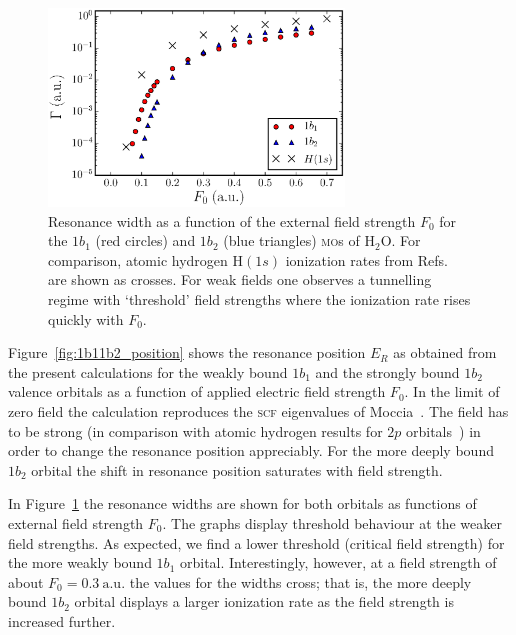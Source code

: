 \begin{figure}
  \centering
  \includegraphics[width=0.7\textwidth]{figures/ch_H2O/1b1_1b2/resWidthvsF1b11b2H1s.eps}
  \caption{Resonance width as a function of the external field
    strength $F_{0}$ for the $1b_{1}$ (red circles) and $1b_{2}$ (blue
    triangles) \textsc{mo}s of H$_{2}$O. For comparison, atomic
    hydrogen H$(1s)$ ionization rates from
    Refs.~\cite{Telnov_1989,Kolosov_1987} are shown as crosses. For
    weak fields one observes a tunnelling regime with `threshold'
    field strengths where the ionization rate rises quickly with
    $F_{0}$.}
  \label{fig:1b11b2_width}
\end{figure}

Figure~\ref{fig:1b11b2_position} shows the resonance position $E_{R}$
as obtained from the present calculations for the weakly bound
$1b_{1}$ and the strongly bound $1b_{2}$ valence orbitals as a
function of applied electric field strength $F_{0}$. In the limit of
zero field the calculation reproduces the \textsc{scf} eigenvalues of
Moccia~\cite{Moccia_1964}. The field has to be strong (in comparison
with atomic hydrogen results for $2p$ orbitals~\cite{Telnov_1989}) in
order to change the resonance position appreciably. For the more
deeply bound $1b_{2}$ orbital the shift in resonance position
saturates with field strength.

In Figure~\ref{fig:1b11b2_width} the resonance widths are shown for
both orbitals as functions of external field strength $F_{0}$. The
graphs display threshold behaviour at the weaker field strengths. As
expected, we find a lower threshold (critical field strength) for the
more weakly bound $1b_{1}$ orbital. Interestingly, however, at a field
strength of about $F_{0} = 0.3\ \mathrm{a.u.}$ the values for the
widths cross; that is, the more deeply bound $1b_{2}$ orbital displays
a larger ionization rate as the field strength is increased further.

